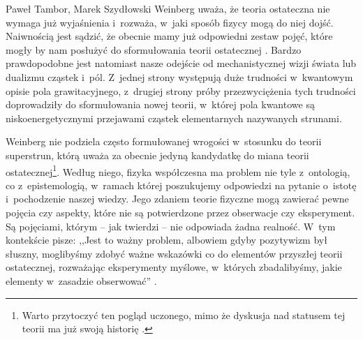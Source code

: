 \begin{artplenv2auth}{Paweł Tambor, Marek Szydłowski}
Weinberg uważa, że teoria ostateczna nie wymaga już wyjaśnienia i~rozważa, w~jaki sposób fizycy mogą do niej dojść. Naiwnością jest sądzić, że obecnie mamy już odpowiedni zestaw pojęć, które mogły by nam posłużyć do sformułowania teorii ostatecznej
\parencite[][s.~139]{weinberg_sen_1992}. %
 Bardzo prawdopodobne jest natomiast nasze odejście od mechanistycznej wizji świata lub dualizmu cząstek i~pól. Z~jednej strony występują duże trudności w~kwantowym opisie pola grawitacyjnego, z~drugiej strony próby przezwyciężenia tych trudności doprowadziły do sformułowania nowej teorii, w~której pola kwantowe są niskoenergetycznymi przejawami cząstek elementarnych nazywanych strunami.

Weinberg nie podziela często formułowanej wrogości w~stosunku do teorii superstrun, którą uważa za obecnie jedyną kandydatkę do miana teorii ostatecznej\footnote{ Warto przytoczyć ten pogląd uczonego, mimo że dyskusja nad statusem tej teorii ma już swoją historię
\parencite[por.][s.~174]{weinberg_sen_1992}.%
 }. Według niego, fizyka współczesna ma problem nie tyle z~ontologią, co z~epistemologią, w~ramach której poszukujemy odpowiedzi na pytanie o~istotę i~pochodzenie naszej wiedzy. Jego zdaniem teorie fizyczne mogą zawierać pewne pojęcia czy aspekty, które nie są potwierdzone przez obserwacje czy eksperyment. Są pojęciami, którym -- jak twierdzi -- nie odpowiada żadna realność. W~tym kontekście pisze: ,,Jest to ważny problem, albowiem gdyby pozytywizm był słuszny, moglibyśmy zdobyć ważne wskazówki co do elementów przyszłej teorii ostatecznej, rozważając eksperymenty myślowe, w~których zbadalibyśmy, jakie elementy w~zasadzie obserwować'' 
\parencite[][s.~141]{weinberg_sen_1992}.%



\end{artplenv2auth}
